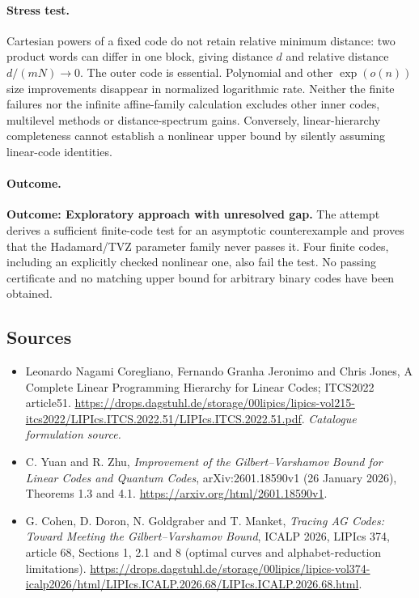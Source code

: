 \documentclass[11pt,a4paper]{article}
\numberwithin{equation}{section}
\begin{document}
\paragraph{Stress test.}
Cartesian powers of a fixed code do not retain relative minimum distance:
two product words can differ in one block, giving distance $d$ and relative
distance $d/(mN)\to0$. The outer code is essential. Polynomial and other
$\exp(o(n))$ size improvements disappear in normalized logarithmic rate.
Neither the finite failures nor the infinite affine-family calculation
excludes other inner codes, multilevel methods or distance-spectrum gains.
Conversely, linear-hierarchy completeness cannot establish a nonlinear
upper bound by silently assuming linear-code identities.

\paragraph{Outcome.}
\textbf{Outcome: Exploratory approach with unresolved gap.}
The attempt derives a sufficient finite-code test for an asymptotic
counterexample and proves that the Hadamard/TVZ parameter family never
passes it. Four finite codes, including an explicitly checked nonlinear
one, also fail the test. No passing certificate and no matching upper bound
for arbitrary binary codes have been obtained.

\subsection{Sources}
\begin{itemize}\raggedright
\item[\textnormal{[S1]}]\hypertarget{source:30006751:1}{} Leonardo Nagami Coregliano, Fernando Granha Jeronimo and Chris Jones, A Complete Linear Programming Hierarchy for Linear Codes; ITCS2022 article51.
\url{https://drops.dagstuhl.de/storage/00lipics/lipics-vol215-itcs2022/LIPIcs.ITCS.2022.51/LIPIcs.ITCS.2022.51.pdf}.
{\small\textit{Catalogue formulation source.}}
\item[\textnormal{[E1]}]\hypertarget{extra:30006751:1}{} C. Yuan and R. Zhu,
\emph{Improvement of the Gilbert--Varshamov Bound for Linear Codes and Quantum
Codes}, arXiv:2601.18590v1 (26 January 2026), Theorems 1.3 and 4.1.
\url{https://arxiv.org/html/2601.18590v1}.
\item[\textnormal{[E2]}]\hypertarget{extra:30006751:2}{} G. Cohen, D. Doron,
N. Goldgraber and T. Manket, \emph{Tracing AG Codes: Toward Meeting the
Gilbert--Varshamov Bound}, ICALP 2026, LIPIcs 374, article 68, Sections 1,
2.1 and 8 (optimal curves and alphabet-reduction limitations).
\url{https://drops.dagstuhl.de/storage/00lipics/lipics-vol374-icalp2026/html/LIPIcs.ICALP.2026.68/LIPIcs.ICALP.2026.68.html}.

\end{itemize}
\end{document}
